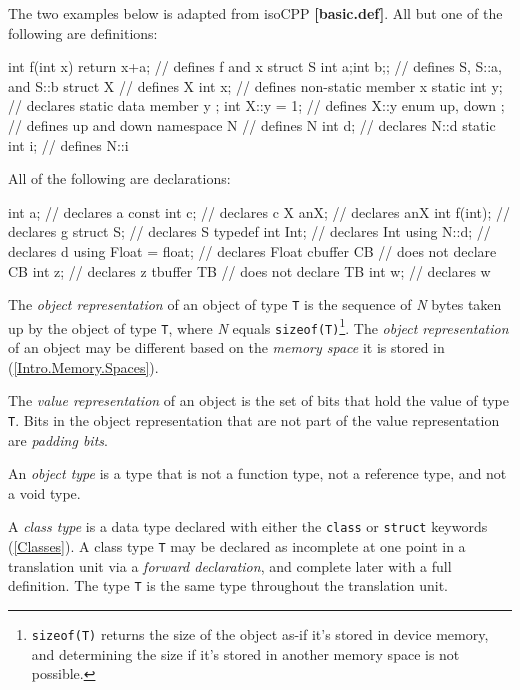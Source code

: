 \p The two examples below is adapted from \gls{isoCPP} \textbf{[basic.def]}. All
but one of the following are definitions:
\begin{HLSL}
int f(int x) { return x+a; } // defines f and x
struct S {int a;int b;};     // defines S, S::a, and S::b
struct X {                   // defines X
  int x;                     // defines non-static member x
  static int y;              // declares static data member y
};
int X::y = 1;                // defines X::y
enum { up, down };           // defines up and down
namespace N {                // defines N
int d;                       // declares N::d
static int i;                // defines N::i
}
\end{HLSL}

\p All of the following are declarations:
\begin{HLSL}
int a;                       // declares a
const int c;                 // declares c
X anX;                       // declares anX
int f(int);                  // declares g
struct S;                    // declares S
typedef int Int;             // declares Int
using N::d;                  // declares d
using Float = float;         // declares Float
cbuffer CB {                 // does not declare CB
  int z;                     // declares z
}
tbuffer TB {                 // does not declare TB
  int w;                     // declares w
}
\end{HLSL}


\p The \textit{object representation} of an object of type \texttt{T} is the
sequence of \textit{N} bytes taken up by the object of type \texttt{T}, where
\textit{N} equals \texttt{sizeof(T)}\footnote{\texttt{sizeof(T)} returns the
size of the object as-if it's stored in device memory, and determining the size
if it's stored in another memory space is not possible.}. The \textit{object
representation} of an object may be different based on the \textit{memory space}
it is stored in (\ref{Intro.Memory.Spaces}).

\p The \textit{value representation} of an object is the set of bits that hold
the value of type \texttt{T}. Bits in the object representation that are not
part of the value representation are \textit{padding bits}.

\p An \textit{object type} is a type that is not a function type, not a
reference type, and not a void type.

\p A \textit{class type} is a data type declared with either the \texttt{class}
or \texttt{struct} keywords (\ref{Classes}). A class type \texttt{T} may be
declared as incomplete at one point in a translation unit via a \textit{forward
declaration}, and complete later with a full definition. The type \texttt{T} is
the same type throughout the translation unit.

